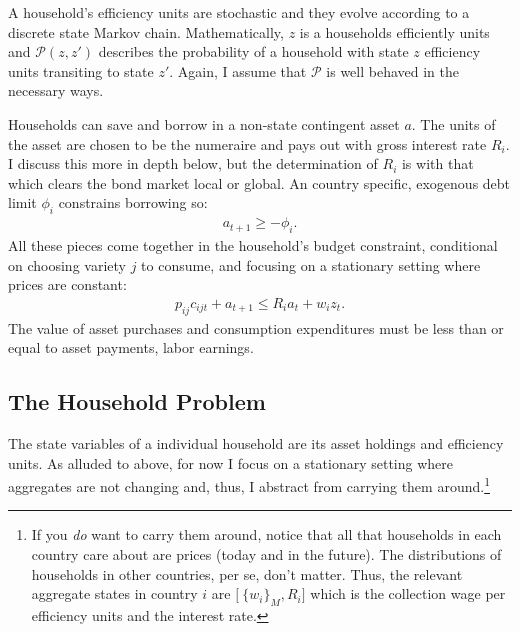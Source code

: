 \documentclass[12pt,pdftex]{article}
\begin{document}
\begin{onehalfspacing}
A household's efficiency units are stochastic and they evolve according to a discrete state Markov chain. Mathematically, $z$ is a households efficiently units and $\mathcal{P}(z,z')$ describes the probability of a household with state $z$ efficiency units transiting to state $z'$. Again, I assume that $\mathcal{P}$ is well behaved in the necessary ways.

Households can save and borrow in a non-state contingent asset $a$. The units of the asset are chosen to be the numeraire and pays out with gross interest rate $R_i$. I discuss this more in depth below, but the determination of $R_{i}$ is with that which clears the bond market local or global. An country specific, exogenous debt limit $\phi_{i}$ constrains borrowing so:
\begin{align}
a_{t+1} \geq - \phi_{i}.
\label{eq:borrowing-constraint}
\end{align}
All these pieces come together in the household's budget constraint, conditional on choosing variety $j$ to consume, and focusing on a stationary setting where prices are constant:
\begin{align}
p_{ij}c_{ijt} +  a_{t+1} \leq    R_{i} a_{t} + w_{i} z_{t}.\label{eq:trade-budget-constraint}
\end{align}
The value of asset purchases and consumption expenditures must be less than or equal to asset payments, labor earnings.

\subsection{The Household Problem}

The state variables of a individual household are its asset holdings and efficiency units. As alluded to above, for now I focus on a stationary setting where aggregates are not changing and, thus, I abstract from carrying them around.\footnote{If you \emph{do} want to carry them around, notice that all that households in each country care about are prices (today and in the future). The distributions of households in other countries, per se, don't matter. Thus, the relevant aggregate states in country $i$ are $\big [ \ \{ w_i \}_{M}, R_i \big ]$ which is the collection wage per efficiency units and the interest rate.}


\end{onehalfspacing}
\end{document}
